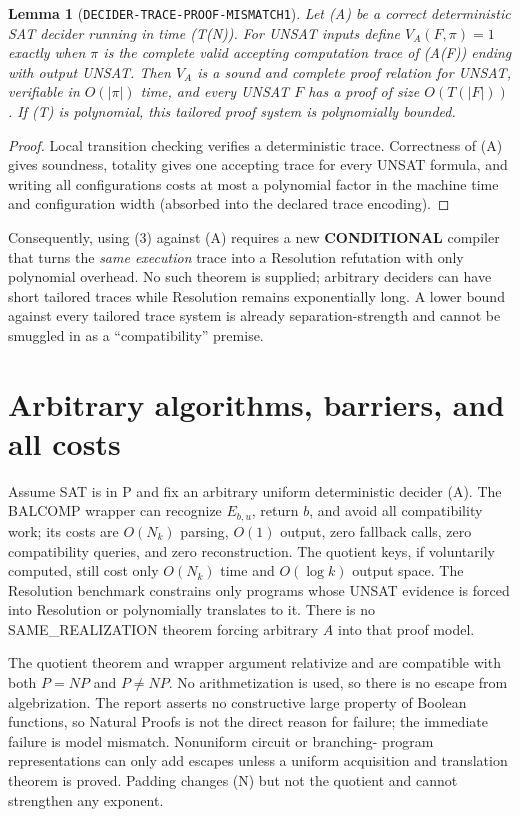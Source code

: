 \documentclass[11pt]{article}
\newtheorem{lemma}{Lemma}
\newcommand{\COND}{\textbf{CONDITIONAL}}
\begin{document}
\begin{lemma}[\texttt{DECIDER-TRACE-PROOF-MISMATCH1}]
Let (A) be a correct deterministic SAT decider running in time (T(N)).
For UNSAT inputs define \(V_A(F,\pi)=1\) exactly when \(\pi\) is the complete
valid accepting computation trace of (A(F)) ending with output UNSAT.  Then
\(V_A\) is a sound and complete proof relation for UNSAT, verifiable in
\(O(|\pi|)\) time, and every UNSAT \(F\) has a proof of size \(O(T(|F|))\).
If (T) is polynomial, this tailored proof system is polynomially bounded.
\end{lemma}
\begin{proof}
Local transition checking verifies a deterministic trace.  Correctness of
(A) gives soundness, totality gives one accepting trace for every UNSAT
formula, and writing all configurations costs at most a polynomial factor in
the machine time and configuration width (absorbed into the declared trace
encoding).
\end{proof}

Consequently, using (3) against (A) requires a new \COND{} compiler that
turns the \emph{same execution} trace into a Resolution refutation with only
polynomial overhead.  No such theorem is supplied; arbitrary deciders can
have short tailored traces while Resolution remains exponentially long.  A
lower bound against every tailored trace system is already separation-strength
and cannot be smuggled in as a ``compatibility'' premise.

\section{Arbitrary algorithms, barriers, and all costs}
Assume SAT is in P and fix an arbitrary uniform deterministic decider (A).
The BALCOMP wrapper can recognize \(E_{b,u}\), return \(b\), and avoid all
compatibility work; its costs are \(O(N_k)\) parsing, \(O(1)\) output, zero
fallback calls, zero compatibility queries, and zero reconstruction.  The
quotient keys, if voluntarily computed, still cost only \(O(N_k)\) time and
\(O(\log k)\) output space.  The Resolution benchmark constrains only programs
whose UNSAT evidence is forced into Resolution or polynomially translates to
it.  There is no SAME\_REALIZATION theorem forcing arbitrary \(A\) into that
proof model.

The quotient theorem and wrapper argument relativize and are compatible with
both \(P=NP\) and \(P\ne NP\).  No arithmetization is used, so there is no
escape from algebrization.  The report asserts no constructive large property
of Boolean functions, so Natural Proofs is not the direct reason for failure;
the immediate failure is model mismatch.  Nonuniform circuit or branching-
program representations can only add escapes unless a uniform acquisition
and translation theorem is proved.  Padding changes (N) but not the quotient
and cannot strengthen any exponent.
\end{document}
